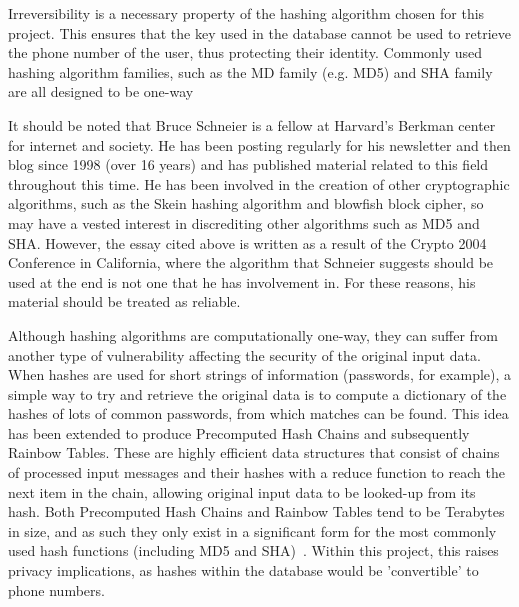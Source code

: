 \documentclass[authoryearcitations]{UoYCSproject}
\begin{document}
Irreversibility is a necessary property of the hashing algorithm chosen for this project.  This ensures that the key used in the database cannot be used to retrieve the phone number of the user, thus protecting their identity.  Commonly used hashing algorithm families, such as the MD family (e.g. MD5) and SHA family are all designed to be one-way~\cite{schneierCryptanalysisMD5SHA}

It should be noted that Bruce Schneier is a fellow at Harvard's Berkman center for internet and society.  He has been posting regularly for his newsletter and then blog since 1998 (over 16 years) and has published material related to this field throughout this time.  He has been involved in the creation of other cryptographic algorithms, such as the Skein hashing algorithm and blowfish block cipher, so may have a vested interest in discrediting other algorithms such as MD5 and SHA.  However, the essay cited above is written as a result of the Crypto 2004 Conference in California, where the algorithm that Schneier suggests should be used at the end is not one that he has involvement in.  For these reasons, his material should be treated as reliable.

Although hashing algorithms are computationally one-way, they can suffer from another type of vulnerability affecting the security of the original input data.  When hashes are used for short strings of information (passwords, for example), a simple way to try and retrieve the original data is to compute a dictionary of the hashes of lots of common passwords, from which matches can be found.  This idea has been extended to produce Precomputed Hash Chains and subsequently Rainbow Tables.  These are highly efficient data structures that consist of chains of processed input messages and their hashes with a reduce function to reach the next item in the chain, allowing original input data to be looked-up from its hash.  Both Precomputed Hash Chains and Rainbow Tables tend to be Terabytes in size, and as such they only exist in a significant form for the most commonly used hash functions (including MD5 and SHA)~\cite{Teat:2011:SCH:2016039.2016072}.  Within this project, this raises privacy implications, as hashes within the database would be 'convertible' to phone numbers.
\end{document}
